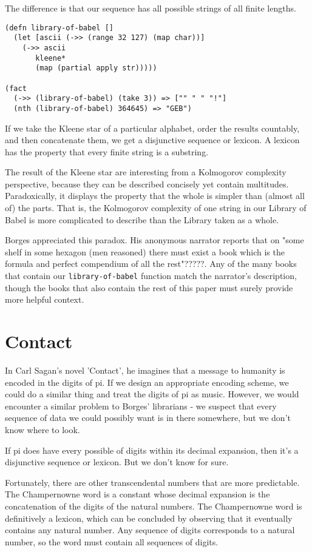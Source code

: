 \documentclass[numbers]{sigplanconf}
\begin{document}
The difference is that our sequence has all possible strings of all finite lengths.

\begin{verbatim}
(defn library-of-babel []
  (let [ascii (->> (range 32 127) (map char))]
    (->> ascii
       kleene*
       (map (partial apply str)))))

(fact
  (->> (library-of-babel) (take 3)) => ["" " " "!"]
  (nth (library-of-babel) 364645) => "GEB")
\end{verbatim}

If we take the Kleene star of a particular alphabet, order the results countably, and then concatenate them, we get
a disjunctive sequence or lexicon. A lexicon has the property that every finite string is a substring.

The result of the Kleene star are interesting from a Kolmogorov complexity perspective, because they can be described
concisely yet contain multitudes. Paradoxically, it displays the property that the whole is simpler than (almost all of)
the parts. That is, the Kolmogorov complexity of one string in our Library of Babel is more complicated to describe
than the Library taken as a whole.

Borges appreciated this paradox. His anonymous narrator reports that on "some shelf in some hexagon (men reasoned)
there must exist a book which is the formula and perfect compendium of all the rest"?????. Any of the many books that contain
our \verb|library-of-babel| function match the narrator's description, though the books that also contain the rest of this paper
must surely provide more helpful context.

\section{Contact}

In Carl Sagan's novel 'Contact', he imagines that a message to humanity is encoded in the digits of pi. If we design an
appropriate encoding scheme, we could do a similar thing and treat the digits of pi as music. However, we would encounter
a similar problem to Borges' librarians - we suspect that every sequence of data we could possibly want is in there
somewhere, but we don't know where to look.

If pi does have every possible of digits within its decimal expansion, then it's a disjunctive
sequence or lexicon. But we don't know for sure.

Fortunately, there are other transcendental numbers that are more predictable. The Champernowne word is a constant whose
decimal expansion is the concatenation of the digits of the natural numbers. The Champernowne word is definitively a lexicon,
which can be concluded by observing that it eventually contains any natural number. Any sequence of digits corresponds to
a natural number, so the word must contain all sequences of digits.
\end{document}
